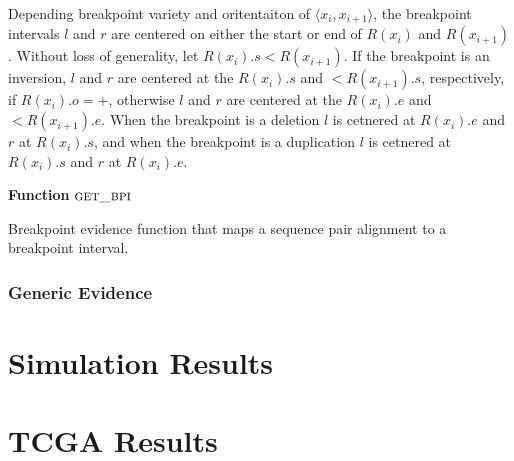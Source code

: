 \documentclass[11pt]{article}
\begin{document}
Depending breakpoint variety and oritentaiton of 
$\langle x_i, x_{i+1} \rangle$, the breakpoint intervals $l$ and $r$ are
centered on either the start or end of $R(x_i)$ and $R(x_{i+1})$.  Without loss
of generality, let $R(x_i).s<R(x_{i+1})$.  If the breakpoint is an inversion,
$l$ and $r$ are centered at the $R(x_i).s$ and $<R(x_{i+1}).s$, respectively, if
$R(x_i).o=+$, otherwise $l$ and $r$ are centered at the $R(x_i).e$ and
$<R(x_{i+1}).e$.  When the breakpoint is a deletion $l$ is cetnered at
$R(x_i).e$ and $r$ at $R(x_i).s$, and when the breakpoint is a duplication
$l$ is cetnered at $R(x_i).s$ and $r$ at $R(x_i).e$.  


\begin{algorithm}[H]
    \DontPrintSemicolon
    \footnotesize
    \BlankLine
    \textbf{Function} $\textsc{get\_bpi}$\;
	\caption{Breakpoint evidence function that maps a sequence pair alignment to
			a breakpoint interval.}
    \label{get_bp_sr}
\end{algorithm}



\subsubsection{Generic Evidence}
\section{Simulation Results}
\section{TCGA Results}



\end{document}
